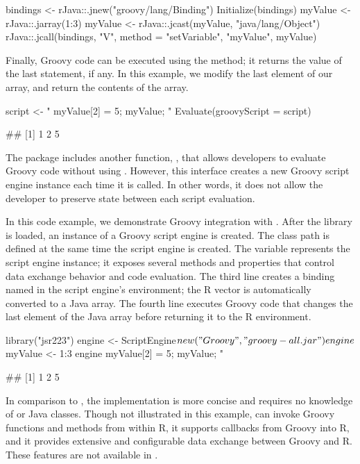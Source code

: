 \begin{example}
bindings <- rJava::.jnew("groovy/lang/Binding")
Initialize(bindings)
myValue <- rJava::.jarray(1:3)
myValue <- rJava::.jcast(myValue, "java/lang/Object")
rJava::.jcall(bindings, "V", method = "setVariable", "myValue", myValue)
\end{example}

Finally, Groovy code can be executed using the  method; it returns the value of the last statement, if any. In this example, we modify the last element of our  array, and return the contents of the array.

\begin{example}
script <- "
  myValue[2] = 5;
  myValue;
"
Evaluate(groovyScript = script)

## [1] 1 2 5
\end{example}

The  package includes another function, , that allows developers to evaluate Groovy code without using . However, this interface creates a new Groovy script engine instance each time it is called. In other words, it does not allow the developer to preserve state between each script evaluation.

In this code example, we demonstrate Groovy integration with . After the library is loaded, an instance of a Groovy script engine is created. The class path is defined at the same time the script engine is created. The variable  represents the script engine instance; it exposes several methods and properties that control data exchange behavior and code evaluation. The third line creates a binding named  in the script engine's environment; the R vector is automatically converted to a Java array. The fourth line executes Groovy code that changes the last element of the  Java array before returning it to the R environment.

\begin{example}
library("jsr223")
engine <- ScriptEngine$new("Groovy", "groovy-all.jar")
engine$myValue <- 1:3
engine %
  myValue[2] = 5;
  myValue;
"

## [1] 1 2 5
\end{example}

In comparison to , the  implementation is more concise and requires no knowledge of  or Java classes. Though not illustrated in this example,  can invoke Groovy functions and methods from within R, it supports callbacks from Groovy into R, and it provides extensive and configurable data exchange between Groovy and R. These features are not available in .

